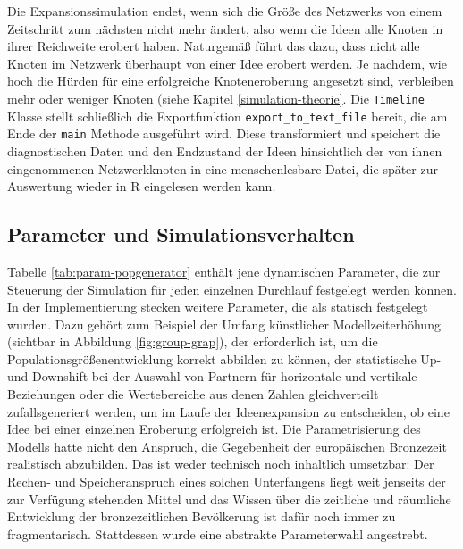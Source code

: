 \documentclass[openany,twoside,twocolumn]{book}
\begin{document}
Die Expansionssimulation endet, wenn sich die Größe des Netzwerks von
einem Zeitschritt zum nächsten nicht mehr ändert, also wenn die Ideen
alle Knoten in ihrer Reichweite erobert haben. Naturgemäß führt das
dazu, dass nicht alle Knoten im Netzwerk überhaupt von einer Idee
erobert werden. Je nachdem, wie hoch die Hürden für eine erfolgreiche
Knoteneroberung angesetzt sind, verbleiben mehr oder weniger Knoten
(siehe Kapitel \ref{simulation-theorie}. Die \texttt{Timeline} Klasse
stellt schließlich die Exportfunktion \texttt{export\_to\_text\_file}
bereit, die am Ende der \texttt{main} Methode ausgeführt wird. Diese
transformiert und speichert die diagnostischen Daten und den Endzustand
der Ideen hinsichtlich der von ihnen eingenommenen Netzwerkknoten in
eine menschenlesbare Datei, die später zur Auswertung wieder in R
eingelesen werden kann.

\hypertarget{simulation-parameters}{%
\subsection{Parameter und
Simulationsverhalten}\label{simulation-parameters}}

Tabelle \ref{tab:param-popgenerator} enthält jene dynamischen Parameter,
die zur Steuerung der Simulation für jeden einzelnen Durchlauf
festgelegt werden können. In der Implementierung stecken weitere
Parameter, die als statisch festgelegt wurden. Dazu gehört zum Beispiel
der Umfang künstlicher Modellzeiterhöhung (sichtbar in Abbildung
\ref{fig:group-grap}), der erforderlich ist, um die
Populationsgrößenentwicklung korrekt abbilden zu können, der
statistische Up- und Downshift bei der Auswahl von Partnern für
horizontale und vertikale Beziehungen oder die Wertebereiche aus denen
Zahlen gleichverteilt zufallsgeneriert werden, um im Laufe der
Ideenexpansion zu entscheiden, ob eine Idee bei einer einzelnen
Eroberung erfolgreich ist. Die Parametrisierung des Modells hatte nicht
den Anspruch, die Gegebenheit der europäischen Bronzezeit realistisch
abzubilden. Das ist weder technisch noch inhaltlich umsetzbar: Der
Rechen- und Speicheranspruch eines solchen Unterfangens liegt weit
jenseits der zur Verfügung stehenden Mittel und das Wissen über die
zeitliche und räumliche Entwicklung der bronzezeitlichen Bevölkerung ist
dafür noch immer zu fragmentarisch. Stattdessen wurde eine abstrakte
Parameterwahl angestrebt.
\end{document}
